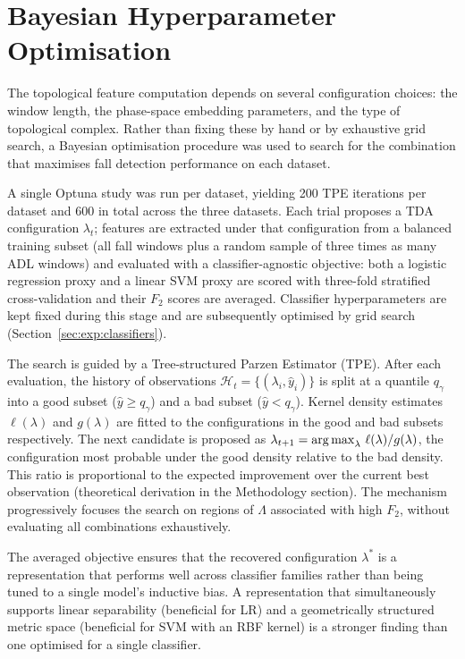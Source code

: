 \section{Bayesian Hyperparameter Optimisation}
\label{subsec:hparam}

The topological feature computation depends on several configuration choices: the window length, the phase-space embedding parameters, and the type of topological complex. Rather than fixing these by hand or by exhaustive grid search, a Bayesian optimisation procedure was used to search for the combination that maximises fall detection performance on each dataset.

A single Optuna study was run per dataset, yielding 200 TPE iterations per dataset and 600 in total across the three datasets. Each trial proposes a TDA configuration $\lambda_t$; features are extracted under that configuration from a balanced training subset (all fall windows plus a random sample of three times as many ADL windows) and evaluated with a classifier-agnostic objective: both a logistic regression proxy and a linear SVM proxy are scored with three-fold stratified cross-validation and their $F_2$ scores are averaged. Classifier hyperparameters are kept fixed during this stage and are subsequently optimised by grid search (Section~\ref{sec:exp:classifiers}).

The search is guided by a Tree-structured Parzen Estimator (TPE). After each evaluation, the history of observations $\mathcal{H}_t=\{(\lambda_i,\hat{y}_i)\}$ is split at a quantile $q_\gamma$ into a good subset ($\hat{y}\geq q_\gamma$) and a bad subset ($\hat{y}<q_\gamma$). Kernel density estimates $\ell(\lambda)$ and $g(\lambda)$ are fitted to the configurations in the good and bad subsets respectively. The next candidate is proposed as $\lambda_{t+1}=\operatorname*{arg\,max}_\lambda\,\ell(\lambda)/g(\lambda)$, the configuration most probable under the good density relative to the bad density. This ratio is proportional to the expected improvement over the current best observation (theoretical derivation in the Methodology section). The mechanism progressively focuses the search on regions of $\Lambda$ associated with high $F_2$, without evaluating all combinations exhaustively.

The averaged objective ensures that the recovered configuration $\lambda^*$ is a representation that performs well across classifier families rather than being tuned to a single model's inductive bias. A representation that simultaneously supports linear separability (beneficial for LR) and a geometrically structured metric space (beneficial for SVM with an RBF kernel) is a stronger finding than one optimised for a single classifier.


